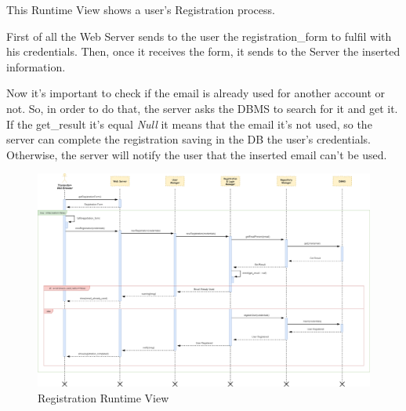 This Runtime View shows a user's Registration process.\par
First of all the Web Server sends to the user the registration\_form to fulfil with his credentials. Then, once it receives the form, it sends to the Server the inserted information.\par
Now it’s important to check if the email is already used for another account or not. So, in order to do that, the server asks the DBMS to search for it and get it. If the get\_result it’s equal \emph{Null} it means that the email it’s not used, so the server can complete the registration saving in the DB the user’s credentials. Otherwise, the server will notify the user that the inserted email can’t be used.
\begin{figure}[H]
	\centering
	\includegraphics[scale=0.2]{Images/Runtime/Registration}
	\caption{Registration Runtime View}
\end{figure}

